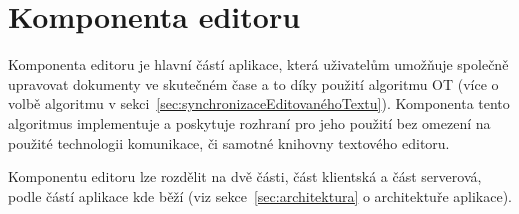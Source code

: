 
\section{Komponenta editoru}\label{sec:komponentaEditoru}

Komponenta editoru je hlavní částí aplikace, která uživatelům umožňuje společně upravovat dokumenty ve skutečném čase a to díky použití algoritmu \gls{OT} (více o volbě algoritmu v sekci~\ref{sec:synchronizaceEditovanéhoTextu}).
Komponenta tento algoritmus implementuje a poskytuje rozhraní pro jeho použití bez omezení na použité technologii komunikace, či samotné knihovny textového editoru.

Komponentu editoru lze rozdělit na dvě části, část klientská a část serverová, podle částí aplikace kde běží (viz sekce~\ref{sec:architektura} o architektuře aplikace).



